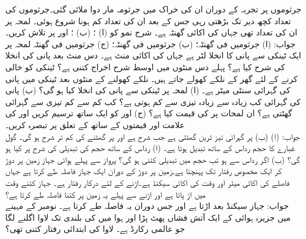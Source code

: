 جرثوموں پر تجربہ کے دوران ان کی خراک میں جرثومہ مار دوا ملائی گئی۔جرثوموں کی تعداد کچھ دیر تک بڑھتی رہی جس کے بعد ان کی تعداد کم ہونا شروع ہوئی۔ لمحہ  پر ان کی تعداد  تھی جہاں  کی اکائی گھنٹہ ہے۔ شرح نمو کو (ا) ؛ (ب) ؛ اور  پر تلاش کریں۔  \\
جواب:\quad
(ا)  جرثومیں فی گھنٹہ؛ (ب)  جرثومیں فی گھنٹہ؛ (ج)  جرثومیں فی گھنٹہ
لمحہ  پر ایک ٹینکی سے پانی کا انخلا  لٹر ہے جہاں  کی اکائی منٹ ہے۔ دس منٹ بعد پانی کی انخلا کی شرح کیا ہے؟ پہلے دس منٹوں میں اوسط شرح اخراج کتنی ہے؟ 
ٹینکی کو خالی کرنے کے لئے گھر کے نلکے کھولے جاتے ہیں۔ نلکے کھولنے کے  منٹوں بعد ٹینکی میں پانی کی گہرائی  سنٹی میٹر ہے۔ (ا) لمحہ  پر ٹینکی سے پانی کی انخلا  کیا ہو گی؟ (ب) پانی کی گہرائی کب زیادہ سے زیادہ تیزی سے کم ہوتی ہے؟ کب کم سے کم تیزی سے گہرائی گھٹتی ہے؟ ان لمحات پر  کی قیمت کیا ہے؟ (ج)  اور  کو ایک ساتھ ترسیم کریں اور  کی علامت اور قیمتوں کے ساتھ  کے تعلق پر تبصرہ کریں۔\\
جواب:\quad
(ا)  (ب)  پر گہرائی تیز ترین گھٹتی ہے  جب شرح  ہے اور  پر گھٹنے کی کم تر شرح  ہو گی۔ 
گول غبارے کا حجم   رداس  کے ساتھ تبدیل ہوتا ہے۔ (ا) رداس کے ساتھ حجم کی تبدیلی کی شرح  پر کیا ہو گی؟ (ب) اگر رداس  سے  ہو تب حجم میں تبدیلی کتنی ہو گی؟
پرواز سے پہلے ہوائی جہاز زمین پر دوڑ کر ایک مخصوص رفتار تک پہنچتا ہے۔زمین پر دوڑ کے دوران ایک جہاز  فاصلہ طے کرتا ہے جہاں فاصلے کی اکائی میٹر اور وقت کی اکائی سیکنڈ ہے۔اڑنے کے لئے درکار رفتار  ہے۔ جہاز کتنے وقت میں اڑ پاتا ہے اور اڑنے سے پہلے یہ زمین پر کتنا فاصلہ طے کرتا ہے؟\\
جواب:\quad
 جہاز  سیکنڈ بعد اڑتا ہے اور جس دوران یہ  فاصلہ طے کرتا ہے۔
  نومبر کے مہینے میں جزیرہ ہوائی کے ایک آتش فشاں پھٹ پڑا اور ہوا میں  کی بلندی تک لاوا اگلنے لگا جو عالمی رکارڈ ہے۔ لاوا کی ابتدائی رفتار کتنی تھی؟  

